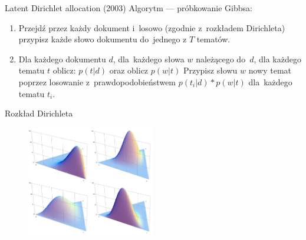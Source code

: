 \documentclass{beamer}
\begin{document}
	\begin{frame}{Latent Dirichlet allocation (2003)}
		Algorytm --- próbkowanie Gibbsa:\\
		\begin{enumerate}
			\setlength\itemsep{2em}
			\item Przejdź przez każdy dokument i~losowo (zgodnie z~rozkładem Dirichleta) przypisz każde słowo dokumentu do~jednego z $T$ tematów.
			
			
			\item Dla każdego dokumentu $d$, dla~każdego słowa $w$ należącego do~$d$, dla każdego tematu $t$ oblicz: $p(t | d)$
			oraz oblicz $p(w | t)$
			Przypisz słowu $w$ nowy temat poprzez losowanie z~prawdopodobieństwem $p(t_i|d)*p(w|t)$ dla~każdego tematu $t_i$.
		\end{enumerate}
		
	\end{frame}
	
	\begin{frame}{Rozkład Dirichleta}
		\begin{figure}
			\centering
			\includegraphics[width=0.5\textwidth]{img/dirichlet.png}
		\end{figure}
	\end{frame}
	
\end{document}
